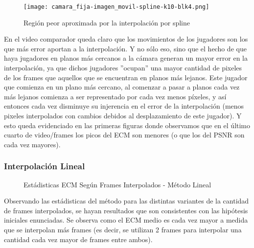 \begin{figure}[H]
    \centering
    \texttt{[image: camara\_fija-imagen\_movil-spline-k10-blk4.png]}
    \label{fig:fija-movil_spline-heatmap}
    \caption{Regi\'on peor aproximada por la interpolaci\'on por spline}
\end{figure}

\par En el video comparador queda claro que los movimientos de los jugadores
son los que m\'as error aportan a la interpolaci\'on. Y no s\'olo eso, sino que
el hecho de que haya jugadores en planos m\'as cercanos a la c\'amara generan
un mayor error en la interpolaci\'on, ya que dichos jugadores ''ocupan'' una
mayor cantidad de pixeles de los frames que aquellos que se encuentran en
planos m\'as lejanos. Este jugador que comienza en un plano m\'as cercano, al
comenzar a pasar a planos cada vez m\'as lejanos comienza a ser representado por
cada vez menos p\'ixeles, y as\'i entonces cada vez disminuye su injerencia
en el error de la interpolaci\'on (menos pixeles interpolados con cambios debidos
al desplazamiento de este jugador). Y esto queda evidenciado en las primeras
figuras donde observamos que en el \'ultimo cuarto de video/frames los picos del
ECM son menores (o que los del PSNR son cada vez mayores).

\subsubsection{Interpolaci\'on Lineal}

\begin{figure}[H]
    \centering
    \caption{Est\'adisticas ECM Seg\'un Frames Interpolados - M\'etodo Lineal}
    \label{fig:fija-movil_lineal-mse_estadisticas}
\end{figure}

\par Observando las est\'adisticas del m\'etodo para las distintas variantes
de la cantidad de frames interpolados, se hayan resultados que son consistentes
con las hip\'otesis iniciales enunciadas. Se observa como el ECM medio es cada
vez mayor a medida que se interpolan m\'as frames (es decir, se utilizan 2 frames
para interpolar una cantidad cada vez mayor de frames entre ambos).

